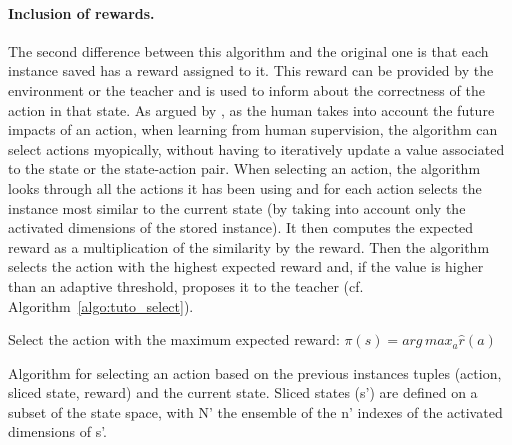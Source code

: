 \paragraph{Inclusion of rewards.} The second difference between this algorithm and the original one is that each instance saved has a reward assigned to it. This reward can be provided by the environment or the teacher and is used to inform about the correctness of the action in that state. As argued by \cite{knox2009interactively}, as the human takes into account the future impacts of an action, when learning from human supervision, the algorithm can select actions myopically, without having to iteratively update a value associated to the state or the state-action pair. When selecting an action, the algorithm looks through all the actions it has been using and for each action selects the instance most similar to the current state (by taking into account only the activated dimensions of the stored instance). It then computes the expected reward as a multiplication of the similarity by the reward. Then the algorithm selects the action with the highest expected reward and, if the value is higher than an adaptive threshold, proposes it to the teacher (cf. Algorithm~\ref{algo:tuto_select}). 

\begin{algorithm}
	\DontPrintSemicolon
	Select the action with the maximum expected reward:
	$\pi(s) = arg\, max_{a} \hat{r}(a)$
	
	\caption{Algorithm for selecting an action based on the previous instances tuples (action, sliced state, reward) and the current state. Sliced states (s') are defined on a subset of the state space, with N' the ensemble of the n' indexes of the activated dimensions of s'.}
	\label{algo:tuto_select}
\end{algorithm}

